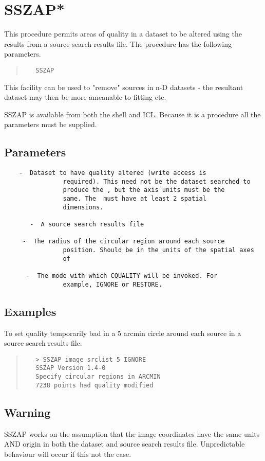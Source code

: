 \documentclass{book}
\renewcommand{\_}{{\tt\char'137}}     %
\begin{document}
\section{SSZAP*}
This procedure permits areas of quality in a dataset to be altered
using the results from a source search results file. The procedure
has the following parameters.
\begin{quote}\begin{verbatim}
   SSZAP
 \end{verbatim}\end{quote}
This facility can be used to "remove" sources in n-D datasets -
the resultant dataset may then be more ameanable to fitting etc.

SSZAP is available from both the shell and ICL. Because it is a procedure
all the parameters must be supplied.

\subsection{Parameters}
\begin{verbatim}
    -  Dataset to have quality altered (write access is
                required). This need not be the dataset searched to
                produce the , but the axis units must be the
                same. The  must have at least 2 spatial
                dimensions.

       -  A source search results file

     -  The radius of the circular region around each source
                position. Should be in the units of the spatial axes
                of

      -  The mode with which CQUALITY will be invoked. For
                example, IGNORE or RESTORE.
\end{verbatim}\subsection{Examples}
To set quality temporarily bad in a 5 arcmin circle around each
source in a source search results file.
\begin{quote}\begin{verbatim}
   > SSZAP image srclist 5 IGNORE
   SSZAP Version 1.4-0
   Specify circular regions in ARCMIN
   7238 points had quality modified
 \end{verbatim}\end{quote}
\subsection{Warning}
SSZAP works on the assumption that the image coordinates have the
same units AND origin in both the dataset and source search results
file. Unpredictable behaviour will occur if this not the case.
\end{document}

